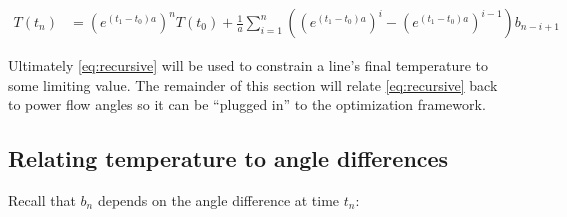 \documentclass{article}
\begin{document}
\begin{align}\label{eq:recursive}
T(t_n) &= (e^{(t_1 - t_0)a})^n T(t_0) + \frac{1}{a} \sum_{i=1}^n \left( (e^{(t_1-t_0)a})^i - (e^{(t_1-t_0)a})^{i-1} \right)b_{n-i+1}
\end{align}

Ultimately \eqref{eq:recursive} will be used to constrain a line's final temperature to some limiting value. The remainder of this section will relate \eqref{eq:recursive} back to power flow angles so it can be ``plugged in'' to the optimization framework.

\subsection{Relating temperature to angle differences}

Recall that $b_n$ depends on the angle difference at time $t_n$:
\end{document}
